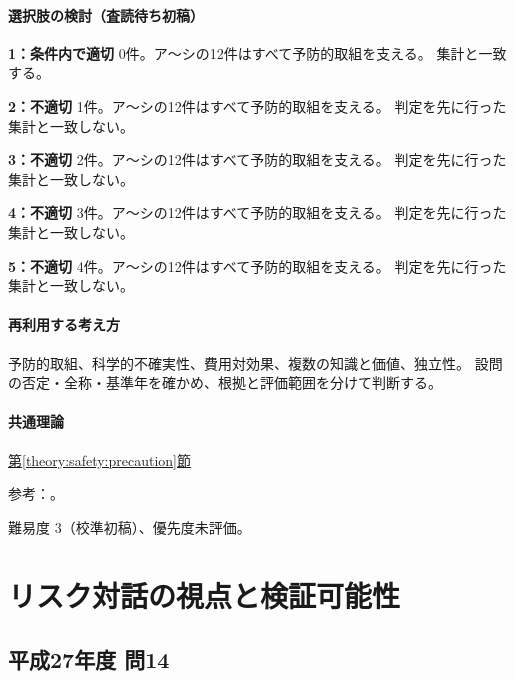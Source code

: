 \paragraph{選択肢の検討（査読待ち初稿）}\mbox{}\par

\noindent\textbf{1：条件内で適切} 0件。ア〜シの12件はすべて予防的取組を支える。 集計と一致する。\par

\noindent\textbf{2：不適切} 1件。ア〜シの12件はすべて予防的取組を支える。 判定を先に行った集計と一致しない。\par

\noindent\textbf{3：不適切} 2件。ア〜シの12件はすべて予防的取組を支える。 判定を先に行った集計と一致しない。\par

\noindent\textbf{4：不適切} 3件。ア〜シの12件はすべて予防的取組を支える。 判定を先に行った集計と一致しない。\par

\noindent\textbf{5：不適切} 4件。ア〜シの12件はすべて予防的取組を支える。 判定を先に行った集計と一致しない。\par

\paragraph{再利用する考え方} 予防的取組、科学的不確実性、費用対効果、複数の知識と価値、独立性。 設問の否定・全称・基準年を確かめ、根拠と評価範囲を分けて判断する。

\paragraph{共通理論} \hyperref[theory:safety:precaution]{第\ref*{theory:safety:precaution}節}

\par 参考：\cite{eth54_eea,eth54_rio}。

\par 難易度 3（校準初稿）、優先度未評価。

\section{リスク対話の視点と検証可能性}

\subsection{平成27年度 問14}
\label{q:h27-reg-apt-14}

